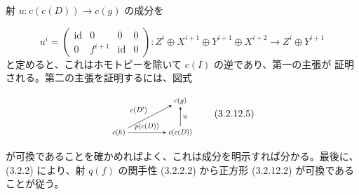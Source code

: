 射 $u\colon c(c(D))\longrightarrow c(g)$ の成分を

\begin{equation}
  u^i=
  \begin{pmatrix}
    \operatorname{id}&0&0&0\\
    0&f^{i+1}&\operatorname{id}&0
  \end{pmatrix}
  \colon Z^i\oplus X^{i+1}\oplus Y^{i+1}\oplus X^{i+2}
  \longrightarrow Z^i\oplus Y^{i+1}
  \tag{3.2.12.4}
\end{equation}
と定めると、これはホモトピーを除いて $c(I)$ の逆であり、第一の主張が
証明される。第二の主張を証明するには、図式

\begin{equation}
  \begin{tikzpicture}[>=stealth,baseline=(current bounding box.center),scale=0.74,
    every node/.style={transform shape}]
    \node (Ch) at (0,0) {$c(h)$};
    \node (Cg) at (3.0,1.55) {$c(g)$};
    \node (CcD) at (3.0,0) {$c(c(D))$};
    \draw[->] (Ch) -- node[above left] {$c(D')$} (Cg);
    \draw[->] (CcD) -- node[right] {$u$} (Cg);
    \draw[->] (Ch) -- node[above] {$p(c(D))$} (CcD);
  \end{tikzpicture}
  \tag{3.2.12.5}
\end{equation}

が可換であることを確かめればよく、これは成分を明示すれば分かる。最後に、
(3.2.2) により、射 $q(f)$ の関手性 (3.2.2.2) から正方形
(3.2.12.2) が可換であることが従う。
\endgroup
